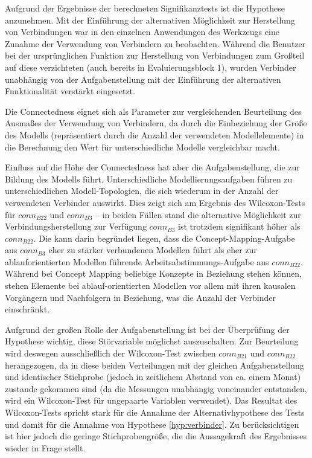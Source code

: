Aufgrund der Ergebnisse der berechneten Signifikanztests ist die Hypothese anzunehmen. Mit der Einführung der alternativen Möglichkeit zur Herstellung von Verbindungen war in den einzelnen Anwendungen des Werkzeugs eine Zunahme der Verwendung von Verbindern zu beobachten. Während die Benutzer bei der ursprünglichen Funktion zur Herstellung von Verbindungen zum Großteil auf diese verzichteten (auch bereits in Evaluierungsblock 1), wurden Verbinder unabhängig von der Aufgabenstellung mit der Einführung der alternativen Funktionalität verstärkt eingesetzt.

Die Connectedness eignet sich als Parameter zur vergleichenden Beurteilung des Ausmaßes der Verwendung von Verbindern, da durch die Einbeziehung der Größe des Modells (repräsentiert durch die Anzahl der verwendeten Modellelemente) in die Berechnung den Wert für unterschiedliche Modelle vergleichbar macht. 

Einfluss auf die Höhe der Connectedness hat aber die Aufgabenstellung, die zur Bildung des Modells führt. Unterschiedliche Modellierungsaufgaben führen zu unterschiedlichen Modell-Topologien, die sich wiederum in der Anzahl der verwendeten Verbinder auswirkt. Dies zeigt sich am Ergebnis des Wilcoxon-Tests für $conn_{B22}$ und $conn_{B3}$ -- in beiden Fällen stand die alternative Möglichkeit zur Verbindungsherstellung zur Verfügung $conn_{B3}$ ist trotzdem signifikant höher als $conn_{B22}$. Die kann darin begründet liegen, dass die Concept-Mapping-Aufgabe aus $conn_{B3}$ eher zu stärker verbundenen Modellen führt als eher zur ablauforientierten Modellen führende Arbeitsabstimmungs-Aufgabe aus $conn_{B22}$. Während bei Concept Mapping beliebige Konzepte in Beziehung stehen können, stehen Elemente bei ablauf-orientierten Modellen vor allem mit ihren kausalen Vorgängern und Nachfolgern in Beziehung, was die Anzahl der Verbinder einschränkt.

Aufgrund der großen Rolle der Aufgabenstellung ist bei der Überprüfung der Hypothese wichtig, diese Störvariable möglichst auszuschalten. Zur Beurteilung wird deswegen ausschließlich der Wilcoxon-Test zwischen $conn_{B21}$ und $conn_{B22}$ herangezogen, da in diese beiden Verteilungen mit der gleichen Aufgabenstellung und identischer Stichprobe (jedoch in zeitlichem Abstand von ca. einem Monat) zustande gekommen sind (da die Messungen unabhängig voneinander entstanden, wird ein Wilcoxon-Test für ungepaarte Variablen verwendet). Das Resultat des Wilcoxon-Tests spricht stark für die Annahme der Alternativhypothese des Tests und damit für die Annahme von Hypothese \ref{hyp:verbinder}. Zu berücksichtigen ist hier jedoch die geringe Stichprobengröße, die die Aussagekraft des Ergebnisses wieder in Frage stellt.

